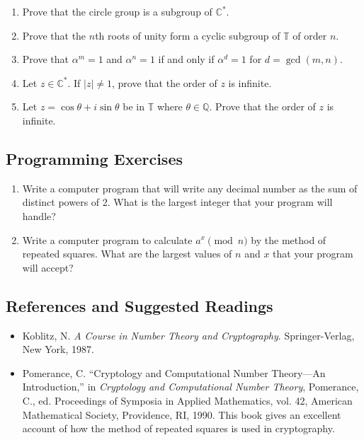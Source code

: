{\begin{enumerate}
 
\bf\item\rm
Prove that the circle group is a subgroup of  ${\mathbb C}^*$.
 
 
\bf\item\rm
Prove that the $n$th roots of unity form a cyclic subgroup of ${\mathbb
T}$  of order $n$. 
 
 
\bf\item\rm
Prove that $\alpha^m =1$ and $\alpha^n = 1$ if and only if $\alpha^d = 1$
for $d = \gcd(m,n)$.
 
 
\bf\item\rm
Let $z \in {\mathbb C}^\ast$. If $|z| \neq 1$, prove that the order of
$z$ is infinite. 
 
 
\bf\item\rm
Let $z =\cos \theta + i \sin \theta$ be in ${\mathbb T}$ where $\theta
\in {\mathbb Q}$.  Prove that the order of $z$ is infinite.
 
\end{enumerate}
}
 
 
\subsection*{Programming Exercises}
 
 
{\small
\begin{enumerate}
 
 
\bf\item\rm
Write a computer program that will write any decimal number as the sum
of distinct powers of 2.  What is the largest integer that your
program will handle?
 
 
\bf\item\rm
Write a computer program to calculate $a^x \pmod{ n}$ by the method of
repeated squares.  What are the largest values of $n$ and $x$ that
your program will accept?  
 
 
\end{enumerate}
}
 
 
\subsection*{References and Suggested Readings}
 
 
{\small
\begin{itemize}
 
\item[{\bf [1]}]%
Koblitz, N. {\it A Course in Number Theory and Cryptography}.
Springer-Verlag, New York, 1987.  
 
 
\item[{\bf [2]}]
Pomerance, C. ``Cryptology and Computational Number Theory---An
Introduction,'' in {\it Cryptology and Computational Number Theory},
Pomerance, C., ed. Proceedings of Symposia in Applied Mathematics,
vol. 42, American Mathematical Society, Providence, RI, 1990.  This
book gives an excellent account of how the method of repeated squares
is used in cryptography. 
 
\end{itemize}
}
 
 
 
